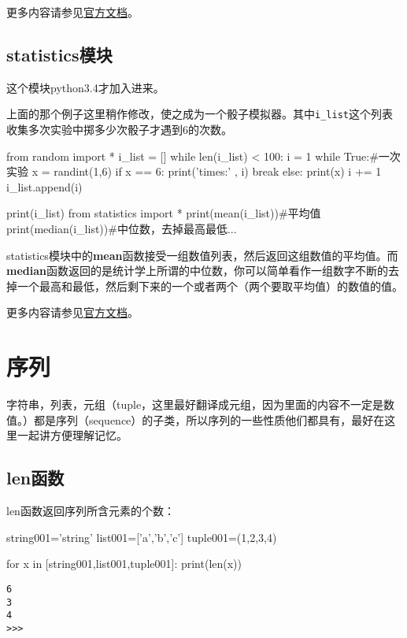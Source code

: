 \documentclass[12pt,oneside]{book}
\begin{document}
\begin{common-format}
\begin{large}
更多内容请参见\href{http://docs.python.org/3.4/library/random.html}{官方文档}。
\end{large}


\subsection{statistics模块}
这个模块python3.4才加入进来。

上面的那个例子这里稍作修改，使之成为一个骰子模拟器。其中\verb+i_list+这个列表收集多次实验中掷多少次骰子才遇到6的次数。
\begin{tcbpython}[]
from random import *
i_list = []
while len(i_list) < 100:
    i = 1
    while True:#一次实验
        x = randint(1,6)
        if x == 6:
            print('times:' , i)
            break
        else:
            print(x)
            i += 1
    i_list.append(i)

print(i_list)
from statistics import *
print(mean(i_list))#平均值
print(median(i_list))#中位数，去掉最高最低...
\end{tcbpython}

statistics模块中的\textbf{mean}函数接受一组数值列表，然后返回这组数值的平均值。而\textbf{median}函数返回的是统计学上所谓的中位数，你可以简单看作一组数字不断的去掉一个最高和最低，然后剩下来的一个或者两个（两个要取平均值）的数值的值。


\begin{large}
更多内容请参见\href{https://docs.python.org/3/library/statistics.html}{官方文档}。
\end{large}


\section{序列}
字符串，列表，元组（tuple，这里最好翻译成元组，因为里面的内容不一定是数值。）都是序列（sequence）的子类，所以序列的一些性质他们都具有，最好在这里一起讲方便理解记忆。

\subsection{len函数}
len函数返回序列所含元素的个数：
\begin{tcbpython}[]
string001='string'
list001=['a','b','c']
tuple001=(1,2,3,4)

for x in [string001,list001,tuple001]:
    print(len(x))
\end{tcbpython}
\begin{Verbatim}
6
3
4
>>> 
\end{Verbatim}




\end{common-format}
\end{document}
